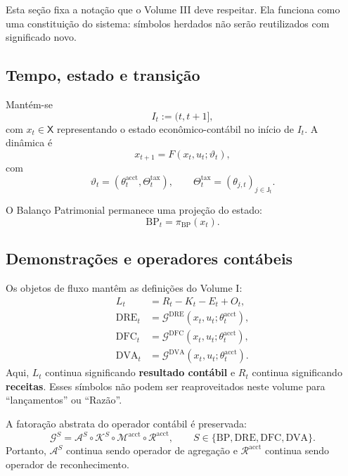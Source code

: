 \documentclass[11pt,a4paper]{article}
\newcommand{\BP}{\mathrm{BP}}
\newcommand{\DRE}{\mathrm{DRE}}
\newcommand{\DFC}{\mathrm{DFC}}
\newcommand{\DVA}{\mathrm{DVA}}
\newcommand{\cG}{\mathcal{G}}
\newcommand{\cA}{\mathcal{A}}
\begin{document}
Esta seção fixa a notação que o Volume III deve respeitar. Ela funciona como uma constituição do sistema: símbolos herdados não serão reutilizados com significado novo.

\subsection{Tempo, estado e transição}

Mantém-se
\begin{equation}
\boxed{I_t:=(t,t+1],}
\end{equation}
com $x_t\in\mathsf X$ representando o estado econômico-contábil no início de $I_t$. A dinâmica é
\begin{equation}
\boxed{x_{t+1}=F(x_t,u_t;\vartheta_t),}
\label{eq:canonical-dynamics}
\end{equation}
com
\begin{equation}
\boxed{
\vartheta_t=(\theta_t^{\mathrm{acct}},\Theta_t^{\mathrm{tax}}),
\qquad
\Theta_t^{\mathrm{tax}}=(\theta_{j,t})_{j\in\mathsf J_t}.
}
\label{eq:canonical-rules}
\end{equation}

O Balanço Patrimonial permanece uma projeção do estado:
\begin{equation}
\boxed{\BP_t=\pi_{\BP}(x_t).}
\end{equation}

\subsection{Demonstrações e operadores contábeis}

Os objetos de fluxo mantêm as definições do Volume I:
\begin{align}
L_t&=R_t-K_t-E_t+O_t,\\
\DRE_t&=\cG^{\DRE}(x_t,u_t;\theta_t^{\mathrm{acct}}),\\
\DFC_t&=\cG^{\DFC}(x_t,u_t;\theta_t^{\mathrm{acct}}),\\
\DVA_t&=\cG^{\DVA}(x_t,u_t;\theta_t^{\mathrm{acct}}).
\end{align}
Aqui, $L_t$ continua significando \textbf{resultado contábil} e $R_t$ continua significando \textbf{receitas}. Esses símbolos não podem ser reaproveitados neste volume para ``lançamentos'' ou ``Razão''.

A fatoração abstrata do operador contábil é preservada:
\begin{equation}
\boxed{
\cG^S=\cA^S\circ\mathcal K^S\circ\mathcal M^{\mathrm{acct}}\circ\mathcal R^{\mathrm{acct}},
\qquad S\in\{\BP,\DRE,\DFC,\DVA\}.
}
\label{eq:canonical-G}
\end{equation}
Portanto, $\cA^S$ continua sendo operador de agregação e $\mathcal R^{\mathrm{acct}}$ continua sendo operador de reconhecimento.
\end{document}
